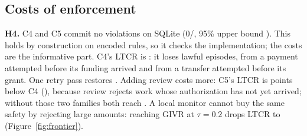 \documentclass[10pt]{article}
\begin{document}
\subsection{Costs of enforcement}
\textbf{H4.} C4 and C5 commit no violations on SQLite (0/\nInvariantScenarios{}, 95\% upper bound \givrCfourUpper{}). This holds by construction on encoded rules, so it checks the implementation; the costs are the informative part. C4's LTCR is \ltcrCfour{}: it loses \guardLostLawful{} lawful episodes, \guardLostOrder{} from a payment attempted before its funding arrived and \guardLostAuth{} from a transfer attempted before its grant. One retry pass restores \ltcrCfourRetry{}. Adding review costs more: C5's LTCR is \ltcrDCfourCfive{} points below C4 (\ltcrDCfourCfiveCI{}), because review rejects work whose authorization has not yet arrived; without those two families both reach \ltcrCoreCfour{}. A local monitor cannot buy the same safety by rejecting large amounts: reaching GIVR \tauGivrTwo{} at $\tau=0.2$ drops LTCR to \tauLtcrTwo{} (Figure~\ref{fig:frontier}).
\end{document}
